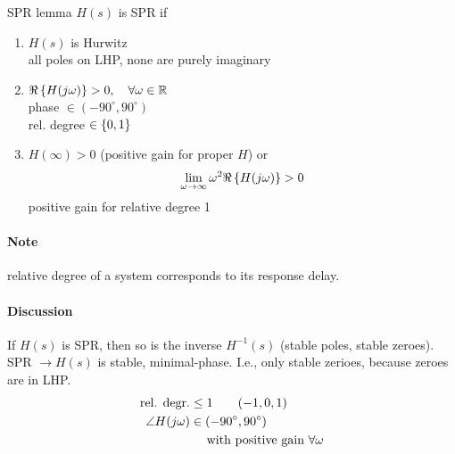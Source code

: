 \begin{definition}{SPR lemma}
$H(s)$ is SPR if
\begin{enumerate}[label=(\roman*)]
\item $H(s)$ is Hurwitz\\
    all poles on LHP, none are purely imaginary
\item $\Re \left\lbrace H(j\omega) \right\rbrace > 0, \quad \forall \omega \in \mathbb{R}$\\
    phase $\in (-90 ^{\circ}, 90 ^{\circ})$\\
    rel. degree $\in \left\lbrace 0, 1 \right\rbrace$
\item $H( \infty) > 0$ (positive gain for proper $H$) or 
\begin{alignat*}{3}
\lim_{\omega \rightarrow \infty} \omega^2 \Re \left\lbrace H(j\omega) \right\rbrace > 0
\end{alignat*}
positive gain for relative degree 1
\end{enumerate}
\end{definition}

\paragraph{Note} relative degree of a system corresponds to
its response delay.

\paragraph{Discussion}
If $H(s)$ is SPR, then so is the inverse $H^{-1}(s)$
(stable poles, stable zeroes).\\

SPR  $\rightarrow H(s)$ is stable, minimal-phase.
I.e., only stable zerioes, because zeroes are in LHP.
\begin{alignat*}{3}
\textnormal{rel. degr.} &\leq 1 \qquad(-1, 0, 1)\\
\angle H(j\omega) &\in (-90 ^{\circ}, 90 ^{\circ})\\
     & \quad \textnormal{ with positive gain } \forall \omega
\end{alignat*}
